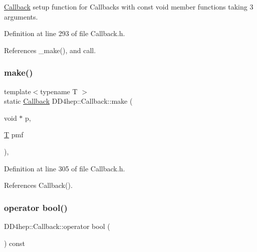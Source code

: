 \hyperlink{class_d_d4hep_1_1_callback}{Callback} setup function for Callbacks with const void member functions taking 3 arguments. 



Definition at line 293 of file Callback.\+h.



References \+\_\+make(), and call.

\hypertarget{class_d_d4hep_1_1_callback_a47c442bf1cc3b69aaa17f4290422e88f}{}\label{class_d_d4hep_1_1_callback_a47c442bf1cc3b69aaa17f4290422e88f} 
\subsubsection{\texorpdfstring{make()}{make()}\hspace{0.1cm}{\footnotesize\ttfamily [17/17]}}
{\footnotesize\ttfamily template$<$typename T $>$ \\
static \hyperlink{class_d_d4hep_1_1_callback}{Callback} D\+D4hep\+::\+Callback\+::make (\begin{DoxyParamCaption}\item[{void $\ast$}]{p,  }\item[{\hyperlink{class_t}{T}}]{pmf }\end{DoxyParamCaption})\hspace{0.3cm}{\ttfamily [inline]}, {\ttfamily [static]}}



Definition at line 305 of file Callback.\+h.



References Callback().

\hypertarget{class_d_d4hep_1_1_callback_a896830a0a56f01764333fa090fe45561}{}\label{class_d_d4hep_1_1_callback_a896830a0a56f01764333fa090fe45561} 
\subsubsection{\texorpdfstring{operator bool()}{operator bool()}}
{\footnotesize\ttfamily D\+D4hep\+::\+Callback\+::operator bool (\begin{DoxyParamCaption}{ }\end{DoxyParamCaption}) const\hspace{0.3cm}{\ttfamily [inline]}}



